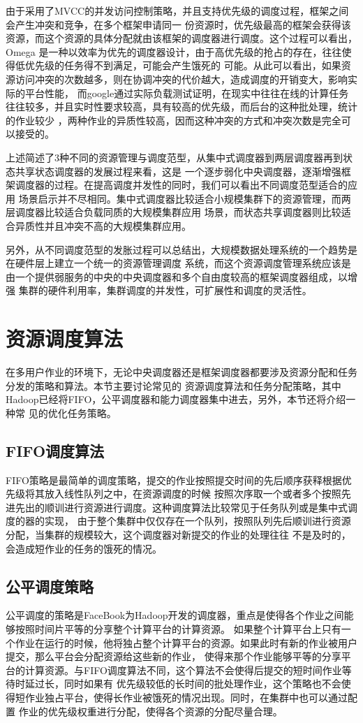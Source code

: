 由于采用了MVCC的并发访问控制策略，并且支持优先级的调度过程，框架之间会产生冲突和竞争，在多个框架申请同一
份资源时，优先级最高的框架会获得该资源，而这个资源的具体分配就由该框架的调度器进行调度。这个过程可以看出，Omega
是一种以效率为优先的调度器设计，由于高优先级的抢占的存在，往往使得低优先级的任务得不到满足，可能会产生饿死的
可能。从此可以看出，如果资源访问冲突的次数越多，则在协调冲突的代价越大，造成调度的开销变大，影响实际的平台性能，
而google通过实际负载测试证明，在现实中往往在线的计算任务往往较多，并且实时性要求较高，具有较高的优先级，而后台的这种批处理，统计的作业较少
，两种作业的异质性较高，因而这种冲突的方式和冲突次数是完全可以接受的。

上述简述了3种不同的资源管理与调度范型，从集中式调度器到两层调度器再到状态共享状态调度器的发展过程来看，这是
一个逐步弱化中央调度器，逐渐增强框架调度器的过程。在提高调度并发性的同时，我们可以看出不同调度范型适合的应用
场景启示并不尽相同。集中式调度器比较适合小规模集群下的资源管理，而两层调度器比较适合负载同质的大规模集群应用
场景，而状态共享调度器则比较适合异质性并且冲突不高的大规模集群应用。

另外，从不同调度范型的发胀过程可以总结出，大规模数据处理系统的一个趋势是在硬件层上建立一个统一的资源管理调度
系统，而这个资源调度管理系统应该是由一个提供弱服务的中央的中央调度器和多个自由度较高的框架调度器组成，以增强
集群的硬件利用率，集群调度的并发性，可扩展性和调度的灵活性。

\section{资源调度算法}
 在多用户作业的环境下，无论中央调度器还是框架调度器都要涉及资源分配和任务分发的策略和算法。本节主要讨论常见的
 资源调度算法和任务分配策略，其中Hadoop已经将FIFO，公平调度器和能力调度器集中进去，另外，本节还将介绍一种常
 见的优化任务策略。
\subsection{FIFO调度算法}
FIFO策略是最简单的调度策略，提交的作业按照提交时间的先后顺序获释根据优先级将其放入线性队列之中，在资源调度的时候
按照次序取一个或者多个按照先进先出的顺训进行资源进行调度。这种调度算法比较常见于任务队列或是集中式调度的器的实现，
由于整个集群中仅仅存在一个队列，按照队列先后顺训进行资源分配，当集群的规模较大，这个调度器对新提交的作业的处理往往
不是及时的，会造成短作业的任务的饿死的情况。
\subsection{公平调度策略}
公平调度的策略是FaceBook为Hadoop开发的调度器，重点是使得各个作业之间能够按照时间片平等的分享整个计算平台的计算资源。
如果整个计算平台上只有一个作业在运行的时候，他将独占整个计算平台的资源。如果此时有新的作业被用户提交，那么平台会分配资源给这些新的作业，
使得来那个作业能够平等的分享平台的计算资源。与FIFO调度算法不同，这个算法不会使得后提交的短时间作业等待时延过长，同时如果有
优先级较低的长时间的批处理作业，这个策略也不会使得短作业独占平台，使得长作业被饿死的情况出现。同时，在集群中也可以通过配置
作业的优先级权重进行分配，使得各个资源的分配尽量合理。


